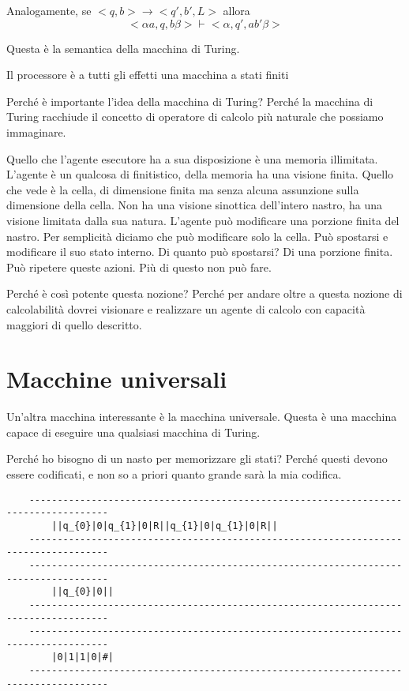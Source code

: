 Analogamente, se $<q,b> \to <q',b',L>$ allora
\begin{equation*}
    <\alpha a,q,b \beta> \vdash <\alpha ,q',ab'\beta>
\end{equation*}

Questa è la semantica della macchina di Turing.

Il processore è a tutti gli effetti una macchina a stati finiti

Perché è importante l'idea della macchina di Turing? Perché la macchina di Turing racchiude il
concetto di operatore di calcolo più naturale che possiamo immaginare. 

Quello che l'agente esecutore ha a sua disposizione è una memoria illimitata. L'agente è un qualcosa
di finitistico, della memoria ha una visione finita. Quello che vede è la cella, di dimensione
finita ma senza alcuna assunzione sulla dimensione della cella. Non ha una visione sinottica
dell'intero nastro, ha una visione limitata dalla sua natura. L'agente può modificare una porzione
finita del nastro. Per semplicità diciamo che può modificare solo la cella.  Può spostarsi e
modificare il suo stato interno. Di quanto può spostarsi? Di una porzione finita. Può ripetere
queste azioni. Più di questo non può fare.

Perché è così potente questa nozione? Perché per andare oltre a questa nozione di calcolabilità
dovrei visionare e realizzare un agente di calcolo con capacità maggiori di quello descritto.

\section{Macchine universali}

Un'altra macchina interessante è la macchina universale. Questa è una macchina capace di eseguire
una qualsiasi macchina di Turing.

Perché ho bisogno di un nasto per memorizzare gli stati? Perché questi devono essere codificati, e
non so a priori quanto grande sarà la mia codifica.

\begin{verbatim}
    ------------------------------------------------------------------------------------
        ||q_{0}|0|q_{1}|0|R||q_{1}|0|q_{1}|0|R||
    ------------------------------------------------------------------------------------
    ------------------------------------------------------------------------------------
        ||q_{0}|0||
    ------------------------------------------------------------------------------------
    ------------------------------------------------------------------------------------
        |0|1|1|0|#|
    ------------------------------------------------------------------------------------
\end{verbatim}

